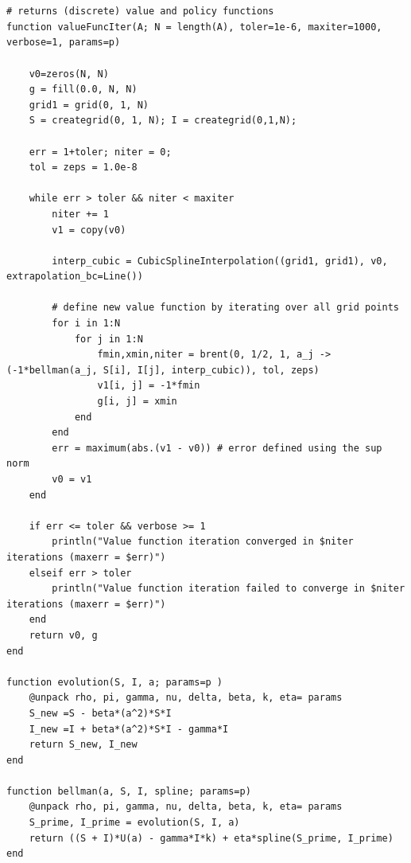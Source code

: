 \documentclass[12pt]{article}
\begin{document}
\begin{lstlisting}


# returns (discrete) value and policy functions
function valueFuncIter(A; N = length(A), toler=1e-6, maxiter=1000, verbose=1, params=p)

	v0=zeros(N, N)
	g = fill(0.0, N, N) 
	grid1 = grid(0, 1, N)
	S = creategrid(0, 1, N); I = creategrid(0,1,N);

	err = 1+toler; niter = 0;
	tol = zeps = 1.0e-8

	while err > toler && niter < maxiter
		niter += 1
		v1 = copy(v0)

		interp_cubic = CubicSplineInterpolation((grid1, grid1), v0, extrapolation_bc=Line())

		# define new value function by iterating over all grid points
		for i in 1:N
			for j in 1:N
				fmin,xmin,niter = brent(0, 1/2, 1, a_j -> (-1*bellman(a_j, S[i], I[j], interp_cubic)), tol, zeps)
				v1[i, j] = -1*fmin
				g[i, j] = xmin
			end
		end
		err = maximum(abs.(v1 - v0)) # error defined using the sup norm
		v0 = v1
	end

	if err <= toler && verbose >= 1
		println("Value function iteration converged in $niter iterations (maxerr = $err)")
	elseif err > toler
		println("Value function iteration failed to converge in $niter iterations (maxerr = $err)")
	end
	return v0, g
end

function evolution(S, I, a; params=p )
	@unpack rho, pi, gamma, nu, delta, beta, k, eta= params
	S_new =S - beta*(a^2)*S*I
	I_new =I + beta*(a^2)*S*I - gamma*I
	return S_new, I_new
end

function bellman(a, S, I, spline; params=p)
	@unpack rho, pi, gamma, nu, delta, beta, k, eta= params
	S_prime, I_prime = evolution(S, I, a)
	return ((S + I)*U(a) - gamma*I*k) + eta*spline(S_prime, I_prime)
end
\end{lstlisting}
\label{code:block1}

\newpage

\printbibliography
\end{document}
